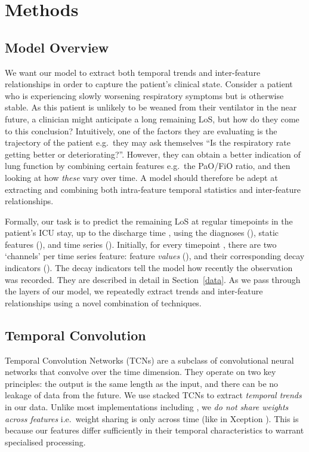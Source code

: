 \documentclass[sigconf]{acmart}
\begin{document}
\section{Methods}
\label{methods}
\subsection{Model Overview}
\label{sec:modeloverview}
We want our model to extract both temporal trends and inter-feature relationships in order to capture the patient's clinical state. Consider a patient who is experiencing slowly worsening respiratory symptoms but is otherwise stable. As this patient is unlikely to be weaned from their ventilator in the near future, a clinician might anticipate a long remaining LoS, but how do they come to this conclusion? Intuitively, one of the factors they are evaluating is the trajectory of the patient e.g.\ they may ask themselves ``Is the respiratory rate getting better or deteriorating?''. However, they can obtain a better indication of lung function by combining certain features e.g.\ the PaO/FiO ratio, and then looking at how \emph{these} vary over time. A model should therefore be adept at extracting and combining both intra-feature temporal statistics and inter-feature relationships.

Formally, our task is to predict the remaining LoS at regular timepoints  in the patient's ICU stay, up to the discharge time , using the diagnoses (), static features (), and time series (). Initially, for every timepoint , there are two `channels' per time series feature:  feature \emph{values} (), and their corresponding decay indicators (). The decay indicators tell the model how recently the observation  was recorded. They are described in detail in Section~\ref{data}. As we pass through the layers of our model, we repeatedly extract trends and inter-feature relationships using a novel combination of techniques.

\subsection{Temporal Convolution}
Temporal Convolution Networks (TCNs) \citep{Simonyan2016,DBLP:journals/corr/KalchbrennerESO16} are a subclass of convolutional neural networks \citep{Fukushima1980} that convolve over the time dimension. They operate on two key principles: the output is the same length as the input, and there can be no leakage of data from the future. We use stacked TCNs to extract \textit{temporal trends} in our data. Unlike most implementations including \cite{sontag}, we \textit{do not share weights across features} i.e.\ weight sharing is only across time (like in Xception \citep{DBLP:journals/corr/Chollet16a}). This is because our features differ sufficiently in their temporal characteristics to warrant specialised processing. 
\end{document}

